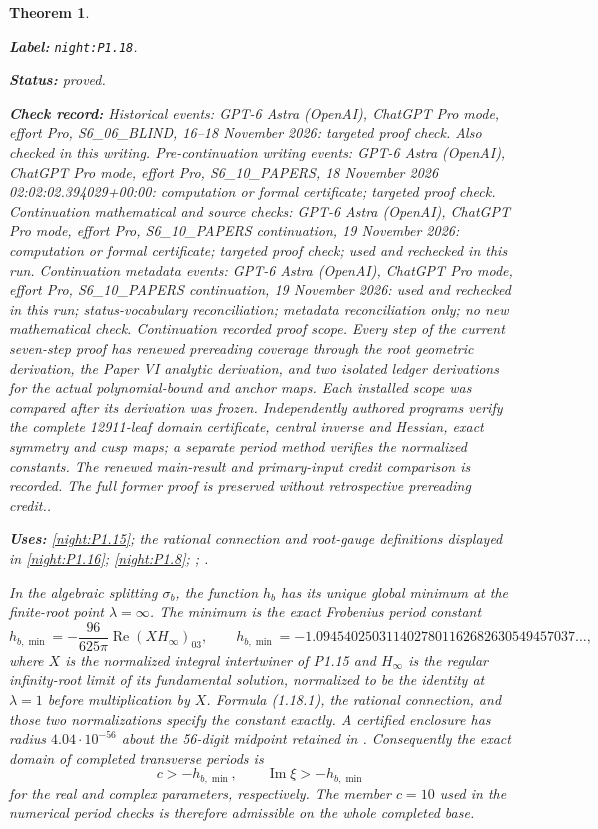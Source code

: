 \documentclass[11pt,a4paper]{article}
\newtheorem{theorem}{Theorem}[section]
\theoremstyle{definition}
\newcommand{\StatementRecord}[4]{\par\smallskip\begingroup\upshape\raggedright\noindent\textbf{Label:} \nolinkurl{#1}.\par\noindent\textbf{Status:} #2.\par\noindent\textbf{Check record:} #3.\par\noindent\textbf{Uses:} #4.\par\endgroup\smallskip}
\begin{document}
\begin{theorem}\label{night:P1.18}
\StatementRecord{night:P1.18}{proved}{Historical events: GPT-6 Astra (OpenAI), ChatGPT Pro mode, effort Pro, S6\_06\_BLIND, 16--18 November 2026: targeted proof check. Also checked in this writing. Pre-continuation writing events: GPT-6 Astra (OpenAI), ChatGPT Pro mode, effort Pro, S6\_10\_PAPERS, 18 November 2026 02:02:02.394029+00:00: computation or formal certificate; targeted proof check. Continuation mathematical and source checks: GPT-6 Astra (OpenAI), ChatGPT Pro mode, effort Pro, S6\_10\_PAPERS continuation, 19 November 2026: computation or formal certificate; targeted proof check; used and rechecked in this run. Continuation metadata events: GPT-6 Astra (OpenAI), ChatGPT Pro mode, effort Pro, S6\_10\_PAPERS continuation, 19 November 2026: used and rechecked in this run; status-vocabulary reconciliation; metadata reconciliation only; no new mathematical check. \emph{Continuation recorded proof scope.} Every step of the current seven-step proof has renewed prereading coverage through the root geometric derivation, the Paper VI analytic derivation, and two isolated ledger derivations for the actual polynomial-bound and anchor maps. Each installed scope was compared after its derivation was frozen. Independently authored programs verify the complete 12911-leaf domain certificate, central inverse and Hessian, exact symmetry and cusp maps; a separate period method verifies the normalized constants. The renewed main-result and primary-input credit comparison is recorded. The full former proof is preserved without retrospective prereading credit.}{\cref{night:P1.15}; the rational connection and root-gauge definitions displayed in \cref{night:P1.16}; \cref{night:P1.8}; \cite[Lemma~2.7, pp.~42--43]{TeschlODE2012}; \cite[\S1.9(iii), (1.9.30)--(1.9.31)]{DLMFCauchy2026}}
In the algebraic splitting $\sigma_b$, the function $h_b$ has its
unique global minimum at the finite-root point $\lambda=\infty$.
The minimum is the exact Frobenius period constant
\[
 h_{b,\min}=-\frac{96}{625\pi}\operatorname{Re}(XH_\infty)_{03},
 \qquad
 h_{b,\min}=-1.0945402503114027801162682630549457037\ldots,
\tag{1.18.1}
\]
where $X$ is the normalized integral intertwiner of P1.15 and
$H_\infty$ is the regular infinity-root limit of its fundamental
solution, normalized to be the identity at $\lambda=1$ before
multiplication by $X$.  Formula (1.18.1), the rational connection,
and those two normalizations specify the constant exactly.
A certified enclosure has radius $4.04\cdot10^{-56}$ about the
56-digit midpoint retained in
.
Consequently the exact domain of completed transverse periods is
\[
 c>-h_{b,\min},\qquad
 \operatorname{Im}\xi>-h_{b,\min}
\]
for the real and complex parameters, respectively.
The member $c=10$ used in the numerical period checks is therefore
admissible on the whole completed base.


\end{theorem}
\end{document}
